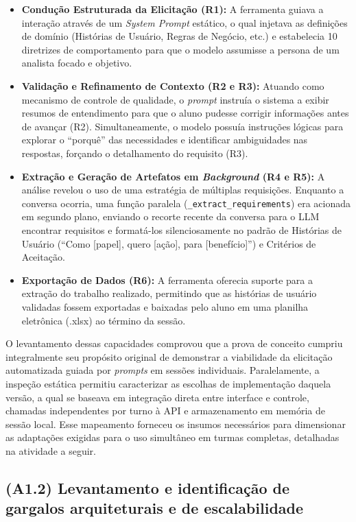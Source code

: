 \begin{itemize}
    \item \textbf{Condução Estruturada da Elicitação (R1):} A ferramenta guiava a interação através de um \textit{System Prompt} estático, o qual injetava as definições de domínio (Histórias de Usuário, Regras de Negócio, etc.) e estabelecia 10 diretrizes de comportamento para que o modelo assumisse a persona de um analista focado e objetivo.
    \item \textbf{Validação e Refinamento de Contexto (R2 e R3):} Atuando como mecanismo de controle de qualidade, o \textit{prompt} instruía o sistema a exibir resumos de entendimento para que o aluno pudesse corrigir informações antes de avançar (R2). Simultaneamente, o modelo possuía instruções lógicas para explorar o ``porquê'' das necessidades e identificar ambiguidades nas respostas, forçando o detalhamento do requisito (R3).
    \item \textbf{Extração e Geração de Artefatos em \textit{Background} (R4 e R5):} A análise revelou o uso de uma estratégia de múltiplas requisições. Enquanto a conversa ocorria, uma função paralela (\texttt{\_extract\_requirements}) era acionada em segundo plano, enviando o recorte recente da conversa para o LLM encontrar requisitos e formatá-los silenciosamente no padrão de Histórias de Usuário (``Como [papel], quero [ação], para [benefício]'') e Critérios de Aceitação.
    \item \textbf{Exportação de Dados (R6):} A ferramenta oferecia suporte para a extração do trabalho realizado, permitindo que as histórias de usuário validadas fossem exportadas e baixadas pelo aluno em uma planilha eletrônica (.xlsx) ao término da sessão.
\end{itemize}

O levantamento dessas capacidades comprovou que a prova de conceito cumpriu integralmente seu propósito original de demonstrar a viabilidade da elicitação automatizada guiada por \textit{prompts} em sessões individuais. Paralelamente, a inspeção estática permitiu caracterizar as escolhas de implementação daquela versão, a qual se baseava em integração direta entre interface e controle, chamadas independentes por turno à API e armazenamento em memória de sessão local. Esse mapeamento forneceu os insumos necessários para dimensionar as adaptações exigidas para o uso simultâneo em turmas completas, detalhadas na atividade a seguir.

\subsection{(A1.2) Levantamento e identificação de gargalos arquiteturais e de escalabilidade}

